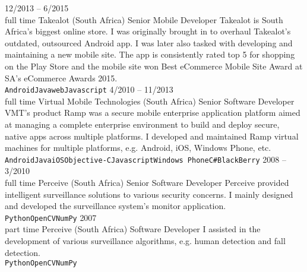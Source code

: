 \documentclass[9pt]{developercv} %
\begin{document}
\begin{entrylist}
	\entry
		{12/2013 -- 6/2015\\\footnotesize{full time}}
		{Takealot {\normalfont\small (South Africa)}}
		{Senior Mobile Developer}
		{Takealot is South Africa's biggest online store. I was originally brought in to overhaul Takealot's outdated, outsourced Android app. I was later also tasked with developing and maintaining a new mobile site. The app is consistently rated top 5 for shopping on the Play Store and the mobile site won Best eCommerce Mobile Site Award at SA's eCommerce Awards 2015.\\ \texttt{Android}\slashsep\texttt{Java}\slashsep\texttt{web}\slashsep\texttt{Javascript}}
	\entry
		{4/2010 -- 11/2013\\\footnotesize{full time}}
		{Virtual Mobile Technologies {\normalfont\small (South Africa)}}
		{Senior Software Developer}
		{VMT's product Ramp was a secure mobile enterprise application platform aimed at managing a complete enterprise environment to build and deploy secure, native apps across multiple platforms. I developed and maintained Ramp virtual machines for multiple platforms, e.g. Android, iOS, Windows Phone, etc. \\ \texttt{Android}\slashsep\texttt{Java}\slashsep\texttt{iOS}\slashsep\texttt{Objective-C}\slashsep\texttt{Javascript}\slashsep\texttt{Windows Phone}\slashsep\texttt{C\#}\slashsep\texttt{BlackBerry}}
	\entry
		{2008 -- 3/2010\\\footnotesize{full time}}
		{Perceive {\normalfont\small (South Africa)}}
		{Senior Software Developer}
		{Perceive provided intelligent surveillance solutions to various security concerns. I mainly designed and developed the surveillance system's monitor application.\\ \texttt{Python}\slashsep\texttt{OpenCV}\slashsep\texttt{NumPy}}
	\entry
		{2007\\\footnotesize{part time}}
		{Perceive {\normalfont\small (South Africa)}}
		{Software Developer}
		{I assisted in the development of various surveillance algorithms, e.g. human detection and fall detection.\\ \texttt{Python}\slashsep\texttt{OpenCV}\slashsep\texttt{NumPy}}
\end{entrylist}


\end{document}
